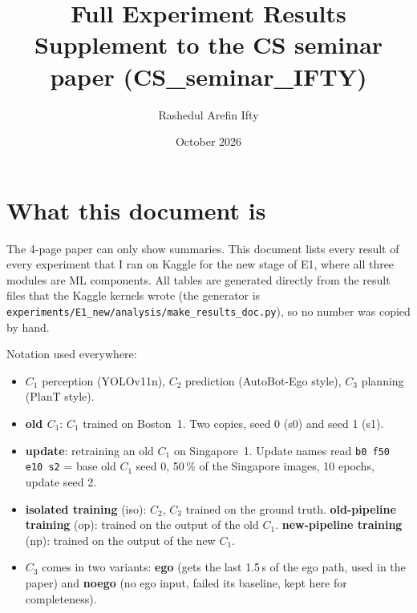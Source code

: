 \documentclass[10pt,a4paper]{article}
\title{Full Experiment Results\\\large Supplement to the CS seminar paper (CS\_seminar\_IFTY)}
\author{Rashedul Arefin Ifty}
\date{October 2026}
\begin{document}
\maketitle
\tableofcontents
\newpage

\FloatBarrier
\section{What this document is}
The 4-page paper can only show summaries. This document lists every result
of every experiment that I ran on Kaggle for the new stage of E1, where all
three modules are ML components. All tables are generated directly from the
result files that the Kaggle kernels wrote (the generator is
\texttt{experiments/E1\_new/analysis/make\_results\_doc.py}), so no number was
copied by hand.

Notation used everywhere:
\begin{itemize}
\item $C_1$ perception (YOLOv11n), $C_2$ prediction (AutoBot-Ego style), $C_3$ planning (PlanT style).
\item \textbf{old $C_1$}: $C_1$ trained on Boston~1. Two copies, seed 0 (s0) and seed 1 (s1).
\item \textbf{update}: retraining an old $C_1$ on Singapore~1. Update names read
\texttt{b0 f50 e10 s2} = base old $C_1$ seed 0, 50\,\% of the Singapore images, 10 epochs, update seed 2.
\item \textbf{isolated training} (iso): $C_2$, $C_3$ trained on the ground truth.
\textbf{old-pipeline training} (op): trained on the output of the old $C_1$.
\textbf{new-pipeline training} (np): trained on the output of the new $C_1$.
\item $C_3$ comes in two variants: \textbf{ego} (gets the last 1.5\,s of the ego path, used in the paper) and \textbf{noego} (no ego input, failed its baseline, kept here for completeness).
\end{itemize}

\FloatBarrier
\end{document}
